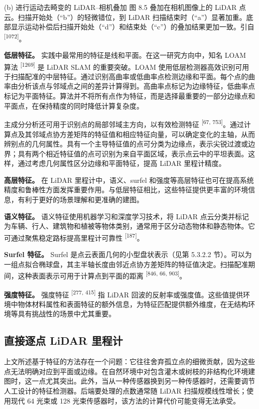 (b) 进行运动去畸变的 LiDAR--相机叠加
图 8.5 叠加在相机图像上的 LiDAR 点云。扫描开始处（“b”）的轻微错位，到 LiDAR 扫描结束时（“a”）显著加重。底部显示运动补偿后扫描开始处（“d”）和结束处（“c”）的叠加结果更加一致。引自 \textsuperscript{[1072]}。

\textbf{低层特征。} 实践中最常用的特征是线和平面。在这一研究方向中，知名 LOAM 算法 \textsuperscript{[1269]} 是 LiDAR SLAM 的重要突破。LOAM 使用低层检测器高效识别可用于扫描配准的中层特征。通过识别高曲率或低曲率点检测边缘和平面。每个点的曲率由分析该点与邻域点之间的差异计算得到。高曲率点标记为边缘特征，低曲率点标记为平面特征。算法并不将所有点作为特征，而是选择最重要的一部分边缘点和平面点，在保持精度的同时降低计算复杂度。

主成分分析还可用于识别点的局部邻域主方向，以有效检测特征 \textsuperscript{[67, 753]}。通过计算点及其邻域点协方差矩阵的特征值和相应特征向量，可以确定变化的主轴，从而辨别点的几何属性。具有一个主导特征值的点可分类为边缘点，表示尖锐过渡或边界；具有两个相近特征值的点可识别为来自平面区域，表示点云中的平坦表面。这样，通过考虑几何属性区分边缘和平面特征，提高 LiDAR 里程计精度。

\textbf{高层特征。} 在 LiDAR 里程计中，语义、surfel 和强度等高层特征也可在提高系统精度和鲁棒性方面发挥重要作用。与低层特征相比，这些特征提供更丰富的环境信息，有利于更好的场景理解和更准确的建图。

\textbf{语义特征。} 语义特征使用机器学习和深度学习技术，将 LiDAR 点云分类并标记为车辆、行人、建筑物和植被等物体类别，通常用于区分动态物体和静态物体。它可通过聚焦稳定路标提高里程计可靠性 \textsuperscript{[187]}。

\textbf{Surfel 特征。} Surfel 是点云表面几何的小型盘状表示（见第 5.3.2.2 节）。可以为一组点拟合椭球盘，其主半轴长度由邻近点协方差矩阵的特征值决定。扫描配准期间，这种表面表示可用于计算点到平面的距离 \textsuperscript{[846, 66, 903]}。

\textbf{强度特征。} 强度特征 \textsuperscript{[277, 415]} 指 LiDAR 回波的反射率或强度值。这些值提供环境中物体材料属性和表面特征的额外信息，为特征匹配提供额外维度，在无结构环境等具有挑战性的场景中尤其重要。

\subsection{直接逐点 LiDAR 里程计}

上文所述基于特征的方法存在一个问题：它往往舍弃孤立点的细微贡献，因为这些点无法明确对应到平面或边缘。在自然环境中对包含灌木或树枝的非结构化环境建图时，这一点尤其突出。此外，当从一种传感器换到另一种传感器时，还需要调节人工设计的特征检测器。后端要处理的点数通常随 LiDAR 扫描规模线性增长；使用现代 64 光束或 128 光束传感器时，该方法的计算代价可能变得无法承受。

